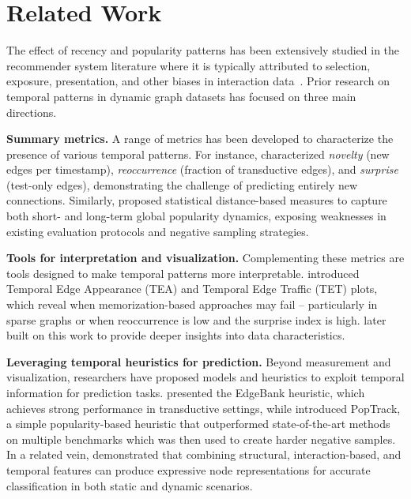 \section{Related Work}
The effect of recency and popularity patterns has been extensively studied in the recommender system literature where it is typically attributed to selection, exposure, presentation, and other biases in interaction data~\citep{chen2023bias,wang2023survey,klimashevskaia2024survey}. Prior research on temporal patterns in dynamic graph datasets has focused on three main directions.

\textbf{Summary metrics.} A range of metrics has been developed to characterize the presence of various temporal patterns. For instance, \citet{poursafaei2022towards} characterized \textit{novelty} (new edges per timestamp), \textit{reoccurrence} (fraction of transductive edges), and \textit{surprise} (test-only edges), demonstrating the challenge of predicting entirely new connections. Similarly, \citet{daniluk2023temporal} proposed statistical distance-based measures to capture both short- and long-term global popularity dynamics, exposing weaknesses in existing evaluation protocols and negative sampling strategies.

\textbf{Tools for interpretation and visualization.} Complementing these metrics are tools designed to make temporal patterns more interpretable. \citet{poursafaei2022towards} introduced Temporal Edge Appearance (TEA) and Temporal Edge Traffic (TET) plots, which reveal when memorization-based approaches may fail -- particularly in sparse graphs or when reoccurrence is low and the surprise index is high. \citet{shirzadkhani2024temporal} later built on this work to provide deeper insights into data characteristics.

\textbf{Leveraging temporal heuristics for prediction.} Beyond measurement and visualization, researchers have proposed models and heuristics to exploit temporal information for prediction tasks. \citet{poursafaei2022towards} presented the EdgeBank heuristic, which achieves strong performance in transductive settings, while \citet{daniluk2023temporal} introduced PopTrack, a simple popularity-based heuristic that outperformed state-of-the-art methods on multiple benchmarks which was then used to create harder negative samples. In a related vein, \citet{poursafaei2022strong} demonstrated that combining structural, interaction-based, and temporal features can produce expressive node representations for accurate classification in both static and dynamic scenarios.%